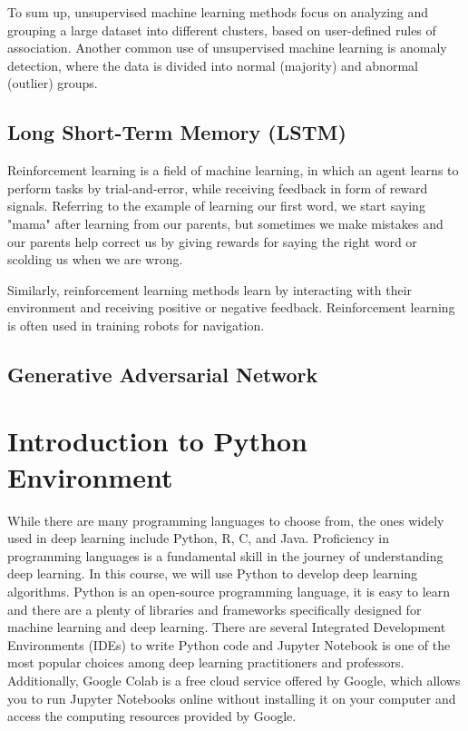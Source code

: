 To sum up, unsupervised machine learning methods focus on analyzing and grouping a large dataset into different clusters, based on user-defined rules of association. Another common use of unsupervised machine learning is anomaly detection, where the data is divided into normal (majority) and abnormal (outlier) groups.

\subsection{Long Short-Term Memory (LSTM)}

Reinforcement learning is a field of machine learning, in which an agent learns to perform tasks by trial-and-error, while receiving feedback in form of reward signals. Referring to the example of learning our first word, we start saying "mama" after learning from our parents, but sometimes we make mistakes and our parents help correct us by giving rewards for saying the right word or scolding us when we are wrong.

Similarly, reinforcement learning methods learn by interacting with their environment and receiving positive or negative feedback. Reinforcement learning is often used in training robots for navigation.

\subsection{Generative Adversarial Network}

\newpage
\section{Introduction to Python Environment}

While there are many programming languages to choose from, the ones widely used in deep learning include Python, R, C, and Java. Proficiency in programming languages is a fundamental skill in the journey of understanding deep learning. In this course, we will use Python \cite{web:python} to develop deep learning algorithms. Python is an open-source programming language, it is easy to learn and there are a plenty of libraries and frameworks specifically designed for machine learning and deep learning. There are several Integrated Development Environments (IDEs) to write Python code and Jupyter Notebook \cite{web:juypter} is one of the most popular choices among deep learning practitioners and professors. Additionally, Google Colab \cite{web:googlecolab} is a free cloud service offered by Google, which allows you to run Jupyter Notebooks online without installing it on your computer and access the computing resources provided by Google.

